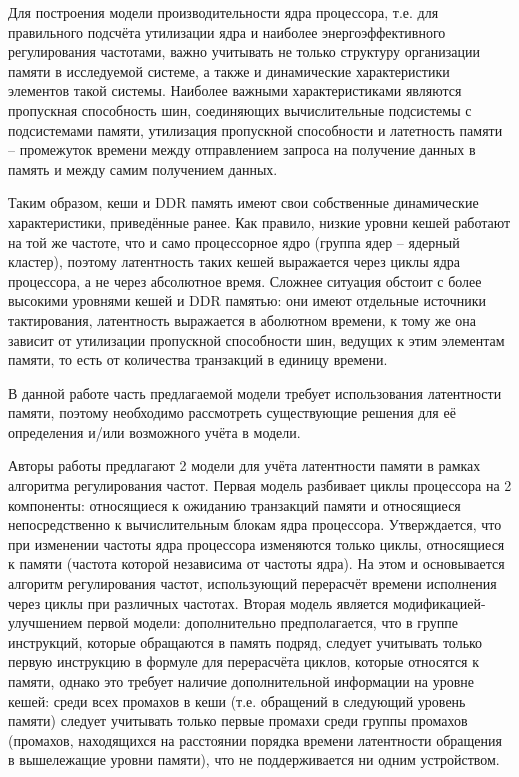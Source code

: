     Для построения модели производительности ядра процессора, т.е. для правильного подсчёта утилизации
    ядра и наиболее энергоэффективного регулирования частотами, важно учитывать не только структуру
    организации памяти в исследуемой системе, а также и динамические характеристики элементов
    такой системы. Наиболее важными характеристиками являются пропускная способность шин,
    соединяющих вычислительные подсистемы с подсистемами памяти, утилизация пропускной способности и
    латетность памяти -- промежуток времени между отправлением запроса на получение данных в память и
    между самим получением данных.

    Таким образом, кеши и DDR память имеют свои собственные динамические характеристики,
    приведённые ранее. Как правило, низкие уровни кешей работают на той же частоте, что
    и само процессорное ядро (группа ядер -- ядерный кластер), поэтому латентность таких кешей
    выражается через циклы ядра процессора, а не через абсолютное время. Сложнее ситуация обстоит
    с более высокими уровнями кешей и DDR памятью: они имеют отдельные источники тактирования,
    латентность выражается в аболютном времени, к тому же она зависит от утилизации
    пропускной способности шин, ведущих к этим элементам памяти, то есть от количества транзакций
    в единицу времени.

    В данной работе часть предлагаемой модели требует использования латентности памяти, поэтому
    необходимо рассмотреть существующие решения для её определения и/или возможного учёта в модели.

    Авторы работы \cite{keramidas2010interval} предлагают 2 модели для учёта латентности памяти
    в рамках алгоритма регулирования частот. Первая модель разбивает циклы процессора на 2
    компоненты: относящиеся к ожиданию транзакций памяти и
    относящиеся непосредственно к вычислительным блокам ядра процессора.
    Утверждается, что при изменении частоты ядра процессора изменяются только циклы, относящиеся к памяти
    (частота которой независима от частоты ядра).
    На этом и основывается алгоритм регулирования частот, использующий перерасчёт времени
    исполнения через циклы при различных частотах. Вторая модель является модификацией-улучшением
    первой модели: дополнительно предполагается, что в группе инструкций, которые обращаются в
    память подряд, следует учитывать только первую инструкцию в формуле для перерасчёта циклов,
    которые относятся к памяти, однако это требует наличие дополнительной информации на уровне кешей:
    среди всех промахов в кеши (т.е. обращений в следующий уровень памяти) следует учитывать только
    первые промахи среди группы промахов (промахов, находящихся на расстоянии порядка времени
    латентности обращения в вышележащие уровни памяти), что не поддерживается ни одним устройством.

